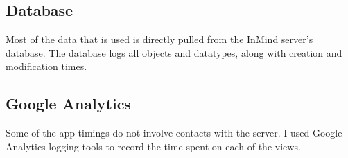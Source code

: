   \subsection{Database}
    Most of the data that is used is directly pulled from
    the InMind server's database.
    The database logs all objects and datatypes,
    along with creation and modification times.

  \subsection{Google Analytics}
    Some of the app timings do not involve contacts with the server.
    I used Google Analytics logging tools to record the time spent
    on each of the views.
